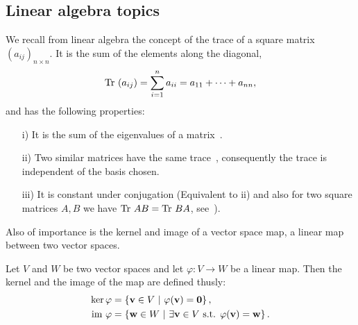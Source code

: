 \subsection{Linear algebra topics}

	
		We recall from linear algebra the concept of the trace of a square matrix $(a_{ij})_{n \times n}$. It is the sum of the elements along the diagonal,
		\begin{align*}
			\text{Tr }(a_{ij})= \sum_{i=1}^{n} a_{ii} = a_{11} + \dots + a_{nn},
		\end{align*}
		and has the following properties:
		\begin{proposition}\label{prop:trace}
			\begin{enumerate}
				\item[i)] It is the sum of the eigenvalues of a matrix~\cite[Cor.8.6.1.]{Nicholson}.
				\item[ii)] Two similar matrices have the same trace~\cite[Thm.5.5.1.]{Nicholson}, consequently the trace is independent of the basis chosen.
				\item[iii)] It is constant under conjugation (Equivalent to ii) and also for two square matrices $A,B$ we have $\text{Tr } AB = \text{Tr } BA$, see~\cite[Ex.2.3.30.]{Nicholson}).
			\end{enumerate}
		\end{proposition}


	Also of importance is the kernel and image of a vector space map, a linear map between two vector spaces. %
		
	\begin{definition}\label{def:kernelimage}
		Let $V$ and $W$ be two vector spaces and let $\varphi: V \rightarrow W$ be a linear map. Then the kernel and the image of the map are defined thusly:
		\begin{align*}
			 \ker \varphi &= \left\lbrace \mathbf{v} \in V \ \middle\vert \ \varphi(\mathbf{v}) = \mathbf{0} \right\rbrace, \\  \text{im } \varphi &= \left\lbrace \mathbf{w} \in W \ \middle\vert \ \exists \mathbf{v} \in V \text{ s.t. } \varphi(\mathbf{v}) = \mathbf{w} \right\rbrace.
		\end{align*}
	\end{definition}
	
